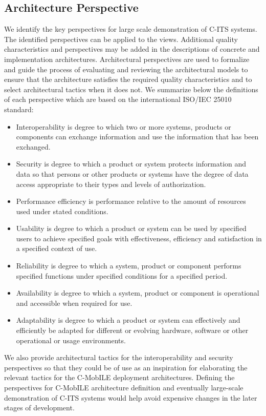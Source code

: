 \documentclass[letterpaper, 10 pt, conference]{ieeeconf}  %
\begin{document}
\subsection{Architecture Perspective}
We identify the key perspectives for large scale demonstration of C-ITS systems. The identified perspectives can be applied to the views. Additional quality characteristics and perspectives may be added in the descriptions of concrete and implementation architectures. Architectural perspectives are used to formalize and guide the process of evaluating and reviewing the architectural models to ensure that the architecture satisfies the required quality characteristics and to select architectural tactics when it does not.
We summarize below the definitions of each perspective which are based on the international ISO/IEC 25010 standard\cite{quality}:

\begin{itemize}
	\item Interoperability is degree to which two or more systems, products or components can exchange information and use the information that has been exchanged.
	\item Security is degree to which a product or system protects information and data so that persons or other products or systems have the degree of data access appropriate to their types and levels of authorization.
	\item Performance efficiency is performance relative to the amount of resources used under stated conditions.
	\item Usability is degree to which a product or system can be used by specified users to achieve specified goals with effectiveness, efficiency and satisfaction in a specified context of use.
	\item Reliability is degree to which a system, product or component performs specified functions under specified conditions for a specified period.
	\item Availability is degree to which a system, product or component is operational and accessible when required for use.
	\item Adaptability is degree to which a product or system can effectively and efficiently be adapted for different or evolving hardware, software or other operational or usage environments.
\end{itemize}

We also provide architectural tactics for the interoperability and security perspectives so that they could be of use as an inspiration for elaborating the relevant tactics for the C-MobILE deployment architectures. Defining the perspectives for C-MobILE architecture definition and eventually large-scale demonstration of C-ITS systems would help avoid expensive changes in the later stages of development.
\end{document}
